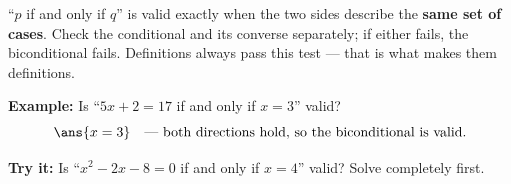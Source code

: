 \documentclass[12pt]{article}
\begin{document}
\begin{formulabox}
``$p$ if and only if $q$'' is valid exactly when the two sides describe the
\textbf{same set of cases}. Check the conditional and its converse separately;
if either fails, the biconditional fails. Definitions always pass this test ---
that is what makes them definitions.
\end{formulabox}

\begin{examplebox}
\textbf{Example:} Is ``$5x + 2 = 17$ if and only if $x = 3$'' valid?
\[ \ans{x = 3} \quad\text{--- both directions hold, so the biconditional is valid.} \]
\end{examplebox}

\begin{tryitbox}
\textbf{Try it:} Is ``$x^2 - 2x - 8 = 0$ if and only if $x = 4$'' valid? Solve
completely first.\\[2pt]
\end{tryitbox}
\end{document}
